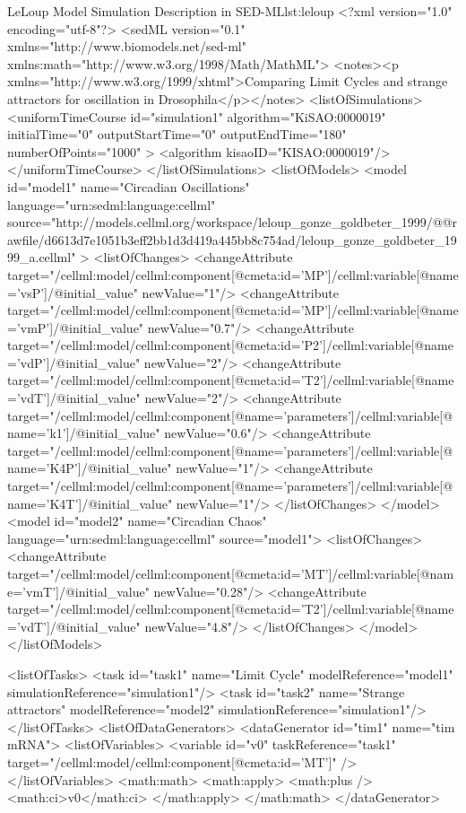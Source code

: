 \footnotesize
\begin{myXmlLst}{LeLoup Model Simulation Description in SED-ML}{lst:leloup}
<?xml version="1.0" encoding="utf-8"?>
<sedML version="0.1" xmlns="http://www.biomodels.net/sed-ml" 
       xmlns:math="http://www.w3.org/1998/Math/MathML">
 <notes><p xmlns="http://www.w3.org/1999/xhtml">Comparing Limit Cycles and strange attractors for
        oscillation in Drosophila</p></notes> 
 <listOfSimulations>
   <uniformTimeCourse id="simulation1" algorithm="KiSAO:0000019" 
    initialTime="0" outputStartTime="0" outputEndTime="180" 
    numberOfPoints="1000" >
     <algorithm kisaoID="KISAO:0000019"/>
    </uniformTimeCourse>
 </listOfSimulations>
 <listOfModels>
  <model id="model1" name="Circadian Oscillations" language="urn:sedml:language:cellml" source="http://models.cellml.org/workspace/leloup_gonze_goldbeter_1999/@@rawfile/d6613d7e1051b3eff2bb1d3d419a445bb8c754ad/leloup_gonze_goldbeter_1999_a.cellml" >
   <listOfChanges>
    <changeAttribute target="/cellml:model/cellml:component[@cmeta:id='MP']/cellml:variable[@name='vsP']/@initial_value" newValue="1"/>
    <changeAttribute target="/cellml:model/cellml:component[@cmeta:id='MP']/cellml:variable[@name='vmP']/@initial_value" newValue="0.7"/>
    <changeAttribute target="/cellml:model/cellml:component[@cmeta:id='P2']/cellml:variable[@name='vdP']/@initial_value" newValue="2"/>
    <changeAttribute target="/cellml:model/cellml:component[@cmeta:id='T2']/cellml:variable[@name='vdT']/@initial_value" newValue="2"/>  
    <changeAttribute target="/cellml:model/cellml:component[@name='parameters']/cellml:variable[@name='k1']/@initial_value" newValue="0.6"/>
    <changeAttribute target="/cellml:model/cellml:component[@name='parameters']/cellml:variable[@name='K4P']/@initial_value" newValue="1"/>
    <changeAttribute target="/cellml:model/cellml:component[@name='parameters']/cellml:variable[@name='K4T']/@initial_value" newValue="1"/>
   </listOfChanges>
  </model>
  <model id="model2" name="Circadian Chaos" language="urn:sedml:language:cellml" source="model1">
   <listOfChanges>
    <changeAttribute target="/cellml:model/cellml:component[@cmeta:id='MT']/cellml:variable[@name='vmT']/@initial_value" newValue="0.28"/>
    <changeAttribute target="/cellml:model/cellml:component[@cmeta:id='T2']/cellml:variable[@name='vdT']/@initial_value" newValue="4.8"/>        
   </listOfChanges>
  </model>
 </listOfModels>
 
  <listOfTasks>
    <task id="task1" name="Limit Cycle" modelReference="model1" simulationReference="simulation1"/>
    <task id="task2" name="Strange attractors" modelReference="model2" simulationReference="simulation1"/>
  </listOfTasks>
  <listOfDataGenerators>
    <dataGenerator id="tim1" name="tim mRNA">
      <listOfVariables>
        <variable id="v0" taskReference="task1" target="/cellml:model/cellml:component[@cmeta:id='MT']" />
      </listOfVariables>
       <math:math>
          <math:apply>
            <math:plus />
            <math:ci>v0</math:ci>
          </math:apply>
        </math:math>
    </dataGenerator>


\end{myXmlLst}
